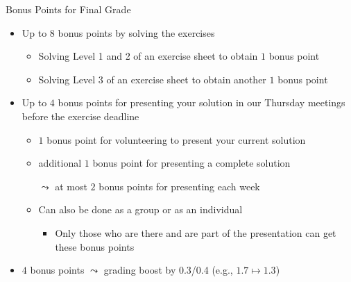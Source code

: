 \documentclass[aspectratio=169, handout]{../latex_main/tntbeamer}  %
\begin{document}
\begin{frame}[c]{Bonus Points for Final Grade}

\begin{itemize}
  \item Up to \alert{$8$ bonus points} by solving the exercises
  \begin{itemize}
      \item Solving Level 1 and 2 of an exercise sheet to obtain $1$ bonus point
      \item Solving Level 3 of an exercise sheet to obtain another $1$ bonus point
  \end{itemize}
  \item Up to \alert{$4$ bonus points} for presenting your solution in our Thursday meetings before the exercise deadline
  \begin{itemize}
      \item $1$ bonus point for volunteering to present your current solution
      \item additional $1$ bonus point for presenting a complete solution
      \item[$\leadsto$] at most $2$ bonus points for presenting each week 
       \item Can also be done as a group or as an individual 
      \begin{itemize}
        \item Only those who are there and are part of the presentation can get these bonus points
      \end{itemize}
  \end{itemize}
      \item $4$ bonus points $\leadsto$ grading boost by 0.3/0.4 (e.g., $1.7 \mapsto 1.3$)
\end{itemize}

\end{frame}
\end{document}
